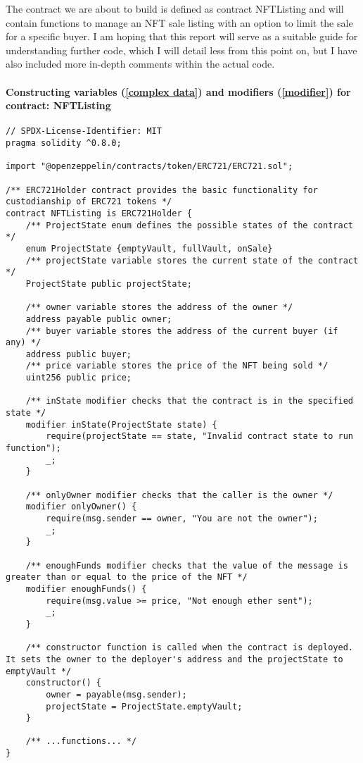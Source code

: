 \documentclass{article}
\theoremstyle{theorem}
\theoremstyle{definition}
\theoremstyle{remark}
\begin{document}
\medskip\noindent
The contract we are about to build is defined as  \colorbox{Gainsboro!60!Lavender}{contract NFTListing} and will contain functions to manage an NFT sale listing with an option to limit the sale for a specific buyer. I am hoping that this report will serve as a suitable guide for understanding further code, which I will detail less from this point on, but I have also included more in-depth comments within the actual code. 

\paragraph{Constructing variables (\ref{complex data}) and modifiers (\ref{modifier}) for contract: \colorbox{Gainsboro!60!Lavender}{NFTListing} }

\begin{itemize}
\begin{lstlisting}
// SPDX-License-Identifier: MIT
pragma solidity ^0.8.0;

import "@openzeppelin/contracts/token/ERC721/ERC721.sol";

/** ERC721Holder contract provides the basic functionality for custodianship of ERC721 tokens */
contract NFTListing is ERC721Holder {
    /** ProjectState enum defines the possible states of the contract */
    enum ProjectState {emptyVault, fullVault, onSale}
    /** projectState variable stores the current state of the contract */
    ProjectState public projectState;

    /** owner variable stores the address of the owner */
    address payable public owner;
    /** buyer variable stores the address of the current buyer (if any) */
    address public buyer;
    /** price variable stores the price of the NFT being sold */
    uint256 public price;

    /** inState modifier checks that the contract is in the specified state */
    modifier inState(ProjectState state) {
        require(projectState == state, "Invalid contract state to run function");
        _;
    }

    /** onlyOwner modifier checks that the caller is the owner */
    modifier onlyOwner() {
        require(msg.sender == owner, "You are not the owner");
        _;
    }

    /** enoughFunds modifier checks that the value of the message is greater than or equal to the price of the NFT */
    modifier enoughFunds() {
        require(msg.value >= price, "Not enough ether sent");
        _;
    }

    /** constructor function is called when the contract is deployed. It sets the owner to the deployer's address and the projectState to emptyVault */
    constructor() {
        owner = payable(msg.sender);
        projectState = ProjectState.emptyVault;
    }

    /** ...functions... */
}
\end{lstlisting}
\end{itemize}
\end{document}
